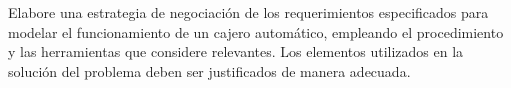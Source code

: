 Elabore una estrategia de negociación de los requerimientos especificados para modelar el funcionamiento de un cajero automático, empleando el procedimiento y las herramientas que considere relevantes. Los elementos utilizados en la solución del problema deben ser justificados de manera adecuada.
